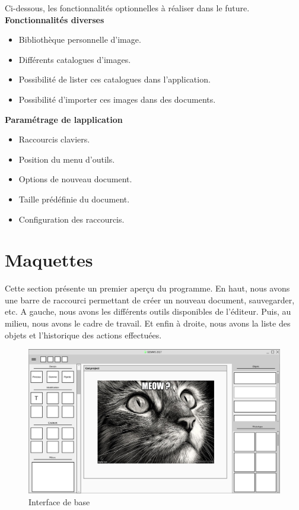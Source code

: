 \documentclass[11pt, a4paper, french]{article}
\begin{document}
		Ci-dessous, les fonctionnalités optionnelles à réaliser dans le future.\\

			\textbf{Fonctionnalités diverses}
			\begin{itemize}[label=\textbullet]
				\item Bibliothèque personnelle d'image.
				\item Différents catalogues d'images.
				\item Possibilité de lister ces catalogues dans l'application.
				\item Possibilité d'importer ces images dans des documents. \\
			\end{itemize}

			\textbf{Paramétrage de l\textquotesingle application}
			\begin{itemize}[label=\textbullet]
				\item Raccourcis claviers.
				\item Position du menu d'outils.
				\item Options de nouveau document.
				\item Taille prédéfinie du document.
				\item Configuration des raccourcis. \\
			\end{itemize}


	\pagebreak
	\section{Maquettes}

		Cette section présente un premier aperçu du programme. En haut, nous avons une barre de raccourci permettant de créer un nouveau document, sauvegarder, etc. A gauche, nous avons les différents outils disponibles de l'éditeur. Puis, au milieu, nous avons le cadre de travail. Et enfin à droite, nous avons la liste des objets et l'historique des actions effectuées.\\

		\begin{figure}[h!]
			\centering
			\graphicspath{{Mockups/}}
			\includegraphics[scale=0.3]{mockups/home_page.png}
			\caption{\label{étiquette} Interface de base}
		\end{figure}
\end{document}
